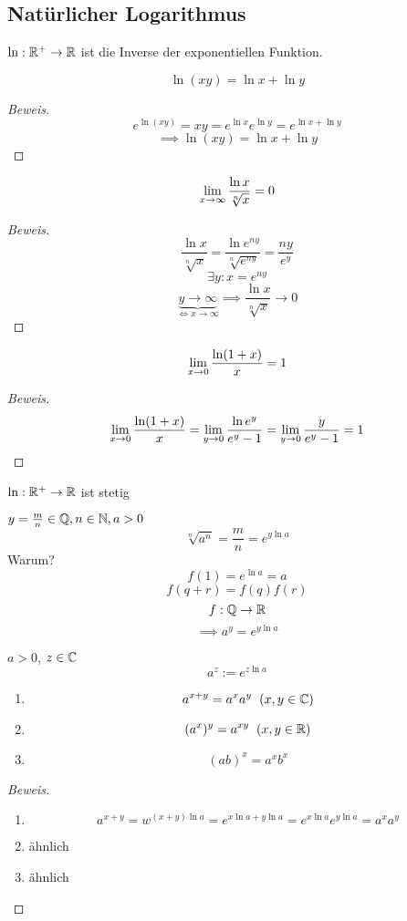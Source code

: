 \subsection{Natürlicher Logarithmus}
\begin{Def}
  $\ln:\mathbb{R}^+\to\mathbb{R}$ ist die Inverse der exponentiellen Funktion.
\end{Def}
\begin{Sat}
  \[\ln(xy)=\ln x + \ln y\]
\end{Sat}
\begin{proof}[Beweis]
  \[e^{\ln(xy)}=xy=e^{\ln x}e^{\ln y}=e^{\ln x + \ln y}\]
  \[\implies \ln(xy)=\ln x + \ln y\]
\end{proof}
\begin{Sat} \label{s:wachstum2}
  \[\displaystyle\lim_{x\rightarrow\infty}\frac{\ln x}{\sqrt[n]{x}}=0\]
\end{Sat}
\begin{proof}[Beweis]
  \[\frac{\ln x}{\sqrt[n]{x}}=\frac{\ln e^{ny}}{\sqrt[n]{e^{ny}}}=\frac{ny}{e^y}\]
  \[\exists y:x=e^{ny}\]
  \[\underbrace{y\to\infty}_{\iff x\to\infty}\implies \frac{\ln x}{\sqrt[n]{x}}\to 0\]
\end{proof}
\begin{Sat}
  \[\displaystyle\lim_{x\rightarrow0}\frac{\ln(1+x)}{x}=1\]
\end{Sat}
\begin{proof}[Beweis]
  \[\displaystyle\lim_{x\rightarrow0}\frac{\ln(1+x)}{x}=\displaystyle\lim_{y\rightarrow0}\frac{\ln e^y}{e^y-1}=\displaystyle\lim_{y\rightarrow0}\frac{y}{e^y-1}=1\]
\end{proof}
\begin{Bem}
  $\ln:\mathbb{R}^+\to\mathbb{R}$ ist stetig
\end{Bem}
\begin{Bem}
  $y=\frac{m}{n}\in\mathbb{Q}, n\in\mathbb{N}, a>0$
  \[\sqrt[n]{a^n}=\frac{m}{n}=e^{y\ln a}\]
  Warum?
  \[f(1)=e^{\ln a} =a\]
  \[f(q+r)=f(q)f(r)\]
  \[f:\mathbb{Q}\to\mathbb{R}\]
  \[\implies a^y=e^{y\ln a}\]
\end{Bem}
\begin{Def}
  $a>0$, $z\in\mathbb{C}$
  \[a^z:=e^{z\ln a}\]
\end{Def}
\begin{Sat}
  \begin{enumerate}
    \item \[a^{x+y}=a^xa^y\hspace{2mm}(x,y\in\mathbb{C})\]
    \item \[(a^x)^y=a^{xy}\hspace{2mm}(x,y\in\mathbb{R})\]
    \item \[(ab)^x=a^xb^x\]
  \end{enumerate}
\end{Sat}
\begin{proof}[Beweis]
  \begin{enumerate}
    \item \[a^{x+y}=w^{(x+y)\ln a}=e^{x\ln a+y\ln a}=e^{x\ln a}e^{y\ln a}=a^xa^y\]
    \item ähnlich
    \item \"ahnlich
  \end{enumerate}
\end{proof}
